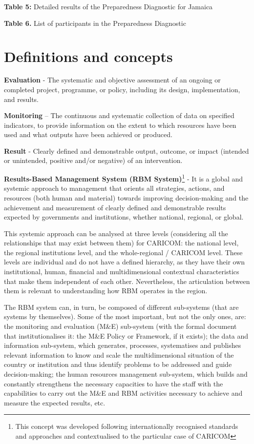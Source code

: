 \documentclass[
  10pt,
]{book}
\begin{document}
\textbf{Table 5:} Detailed results of the Preparedness Diagnostic for Jamaica

\textbf{Table 6.} List of participants in the Preparedness Diagnostic

\hypertarget{definitions-and-concepts}{%
\chapter*{Definitions and concepts}\label{definitions-and-concepts}}

\textbf{Evaluation} - The systematic and objective assessment of an ongoing or completed project, programme, or policy, including its design, implementation, and results.

\textbf{Monitoring} -- The continuous and systematic collection of data on specified indicators, to provide information on the extent to which resources have been used and what outputs have been achieved or produced.

\textbf{Result} - Clearly defined and demonstrable output, outcome, or impact (intended or unintended, positive and/or negative) of an intervention.

\textbf{Results-Based Management System (RBM System)}\footnote{This concept was developed following internationally recognised standards and approaches and contextualised to the particular case of CARICOM} - It is a global and systemic approach to management that orients all strategies, actions, and resources (both human and material) towards improving decision-making and the achievement and measurement of clearly defined and demonstrable results expected by governments and institutions, whether national, regional, or global.

This systemic approach can be analysed at three levels (considering all the relationships that may exist between them) for CARICOM: the national level, the regional institutions level, and the whole-regional / CARICOM level. These levels are individual and do not have a defined hierarchy, as they have their own institutional, human, financial and multidimensional contextual characteristics that make them independent of each other. Nevertheless, the articulation between them is relevant to understanding how RBM operates in the region.

The RBM system can, in turn, be composed of different sub-systems (that are systems by themselves). Some of the most important, but not the only ones, are: the monitoring and evaluation (M\&E) sub-system (with the formal document that institutionalises it: the M\&E Policy or Framework, if it exists); the data and information sub-system, which generates, processes, systematises and publishes relevant information to know and scale the multidimensional situation of the country or institution and thus identify problems to be addressed and guide decision-making; the human resources management sub-system, which builds and constantly strengthens the necessary capacities to have the staff with the capabilities to carry out the M\&E and RBM activities necessary to achieve and measure the expected results, etc.
\end{document}
